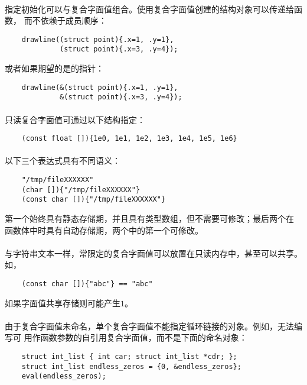 {\paragraph{}
\ex 指定初始化可以与复合字面值组合。使用复合字面值创建的结构对象可以传递给函数，
而不依赖于成员顺序：
\begin{lstlisting}
    drawline((struct point){.x=1, .y=1},
             (struct point){.x=3, .y=4});
\end{lstlisting}
或者如果期望的是的指针：
\begin{lstlisting}
    drawline(&(struct point){.x=1, .y=1},
             &(struct point){.x=3, .y=4});
\end{lstlisting}

\paragraph{}
\ex 只读复合字面值可通过以下结构指定：
\begin{lstlisting}
    (const float []){1e0, 1e1, 1e2, 1e3, 1e4, 1e5, 1e6}
\end{lstlisting}

\paragraph{}
\ex 以下三个表达式具有不同语义：
\begin{lstlisting}
    "/tmp/fileXXXXXX"
    (char []){"/tmp/fileXXXXXX"}
    (const char []){"/tmp/fileXXXXXX"}
\end{lstlisting}
第一个始终具有静态存储期，并且具有类型数组，但不需要可修改；最后两个在
函数体中时具有自动存储期，两个中的第一个可修改。

\paragraph{}
\ex 与字符串文本一样，常限定的复合字面值可以放置在只读内存中，甚至可以共享。如，
\begin{lstlisting}
    (const char []){"abc"} == "abc"
\end{lstlisting}
如果字面值共享存储则可能产生$1$。

\paragraph{}
\ex 由于复合字面值未命名，单个复合字面值不能指定循环链接的对象。例如，无法编写可
用作函数参数的自引用复合字面值，而不是下面的命名对象：
\begin{lstlisting}
    struct int_list { int car; struct int_list *cdr; };
    struct int_list endless_zeros = {0, &endless_zeros};
    eval(endless_zeros);
\end{lstlisting}

}
